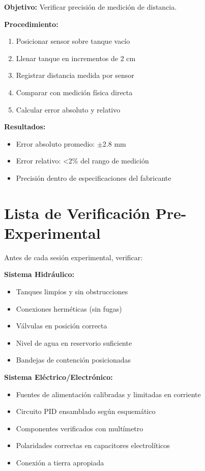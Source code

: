 \documentclass[conference]{IEEEtran}
\begin{document}
\textbf{Objetivo:} Verificar precisión de medición de distancia.

\textbf{Procedimiento:}
\begin{enumerate}
\item Posicionar sensor sobre tanque vacío
\item Llenar tanque en incrementos de 2 cm
\item Registrar distancia medida por sensor
\item Comparar con medición física directa
\item Calcular error absoluto y relativo
\end{enumerate}

\textbf{Resultados:}
\begin{itemize}
\item Error absoluto promedio: $\pm$2.8 mm
\item Error relativo: <2\% del rango de medición
\item Precisión dentro de especificaciones del fabricante
\end{itemize}

\section{Lista de Verificación Pre-Experimental}

Antes de cada sesión experimental, verificar:

\textbf{Sistema Hidráulico:}
\begin{itemize}
\item[$\square$] Tanques limpios y sin obstrucciones
\item[$\square$] Conexiones herméticas (sin fugas)
\item[$\square$] Válvulas en posición correcta
\item[$\square$] Nivel de agua en reservorio suficiente
\item[$\square$] Bandejas de contención posicionadas
\end{itemize}

\textbf{Sistema Eléctrico/Electrónico:}
\begin{itemize}
\item[$\square$] Fuentes de alimentación calibradas y limitadas en corriente
\item[$\square$] Circuito PID ensamblado según esquemático
\item[$\square$] Componentes verificados con multímetro
\item[$\square$] Polaridades correctas en capacitores electrolíticos
\item[$\square$] Conexión a tierra apropiada
\end{itemize}
\end{document}
